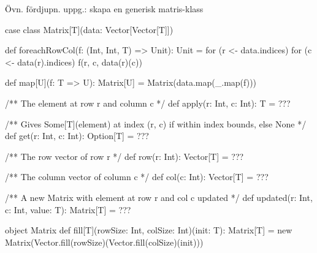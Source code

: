 \begin{Slide}{Övn. fördjupn. uppg.: skapa en generisk matris-klass}\SlideFontSmall
\vspace{-0.7em}
\begin{Code}[basicstyle=\SlideFontSize{6}{6.8}\ttfamily\selectfont]
case class Matrix[T](data: Vector[Vector[T]]){

  def foreachRowCol(f: (Int, Int, T) => Unit): Unit =
    for (r <- data.indices) {
      for (c <- data(r).indices) {
        f(r, c, data(r)(c))
      }
    }

  def map[U](f: T => U): Matrix[U] = Matrix(data.map(_.map(f)))

  /** The element at row r and column c */
  def apply(r: Int, c: Int): T = ???

  /** Gives Some[T](element) at index (r, c) if within index bounds, else None */
  def get(r: Int, c: Int): Option[T] = ???

  /** The row vector of row r */
  def row(r: Int): Vector[T] = ???

  /** The column vector of column c */
  def col(c: Int): Vector[T] = ???

  /** A new Matrix with element at row r and col c updated */
  def updated(r: Int, c: Int, value: T): Matrix[T] = ???
}
object Matrix {
  def fill[T](rowSize: Int, colSize: Int)(init: T): Matrix[T] =
    new Matrix(Vector.fill(rowSize)(Vector.fill(colSize)(init)))
}
\end{Code}
\end{Slide}
